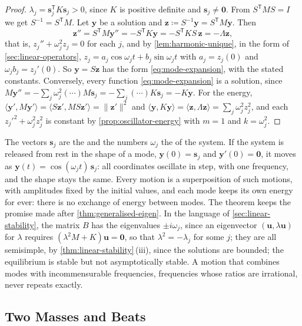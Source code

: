 \begin{proof}
$\lambda_j=\mathbf s_j^{\mathsf T}K\mathbf s_j>0$, since $K$ is positive definite and $\mathbf s_j\ne\mathbf 0$. From $S^{\mathsf T}MS=I$ we get $S^{-1}=S^{\mathsf T}M$. Let $\mathbf y$ be a solution and $\mathbf z\coloneqq S^{-1}\mathbf y=S^{\mathsf T}M\mathbf y$. Then
\[
\mathbf z''=S^{\mathsf T}M\mathbf y''=-S^{\mathsf T}K\mathbf y=-S^{\mathsf T}KS\,\mathbf z=-\Lambda\mathbf z ,
\]
that is, $z_j''+\omega_j^2z_j=0$ for each $j$, and by \cref{lem:harmonic-unique}, in the form of \cref{sec:linear-operators}, $z_j=a_j\cos\omega_jt+b_j\sin\omega_jt$ with $a_j=z_j(0)$ and $\omega_jb_j=z_j'(0)$. So $\mathbf y=S\mathbf z$ has the form \eqref{eq:mode-expansion}, with the stated constants. Conversely, every function \eqref{eq:mode-expansion} is a solution, since $M\mathbf y''=-\sum_j\omega_j^2(\cdots)M\mathbf s_j=-\sum_j(\cdots)K\mathbf s_j=-K\mathbf y$. For the energy, $\langle\mathbf y',M\mathbf y'\rangle=\langle S\mathbf z',MS\mathbf z'\rangle=\|\mathbf z'\|^2$ and $\langle\mathbf y,K\mathbf y\rangle=\langle\mathbf z,\Lambda\mathbf z\rangle=\sum_j\omega_j^2z_j^2$, and each $z_j'^2+\omega_j^2z_j^2$ is constant by \cref{prop:oscillator-energy} with $m=1$ and $k=\omega_j^2$.
\end{proof}

The vectors $\mathbf s_j$ are the  and the numbers $\omega_j$ the  of the system. If the system is released from rest in the shape of a mode, $\mathbf y(0)=\mathbf s_j$ and $\mathbf y'(0)=\mathbf 0$, it moves as $\mathbf y(t)=\cos(\omega_jt)\,\mathbf s_j$: all coordinates oscillate in step, with one frequency, and the shape stays the same. Every motion is a superposition of such motions, with amplitudes fixed by the initial values, and each mode keeps its own energy for ever: there is no exchange of energy between modes. The theorem keeps the promise made after \cref{thm:generalised-eigen}. In the language of \cref{sec:linear-stability}, the matrix $B$ has the eigenvalues $\pm i\omega_j$, since an eigenvector $(\mathbf u,\lambda\mathbf u)$ for $\lambda$ requires $(\lambda^2M+K)\mathbf u=\mathbf 0$, so that $\lambda^2=-\lambda_j$ for some $j$; they are all semisimple, by \cref{thm:linear-stability}\,(iii), since the solutions are bounded; the equilibrium is stable but not asymptotically stable. A motion that combines modes with incommensurable frequencies, frequencies whose ratios are irrational, never repeats exactly.

\subsection{Two Masses and Beats}

